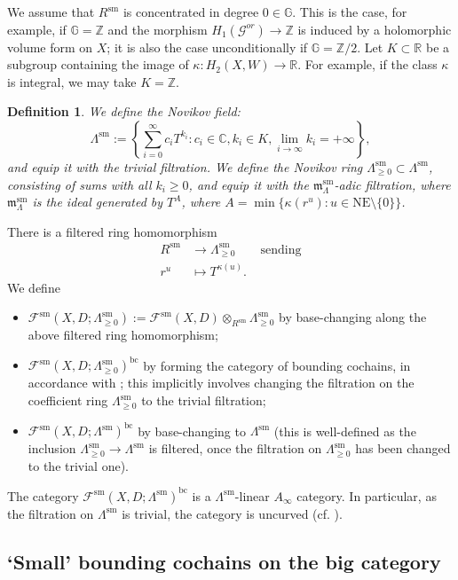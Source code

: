 \documentclass{article}
\newtheorem{defn}[lem]{Definition}
\def\G{\mathbb{G}}
\def\cG{\mathcal{G}}
\def\fuk{\EuF}
\def\bc{\mathsf{bc}}
\newcommand{\fm}{\mathfrak{m}}
\def\G{\mathbb{G}}
\def\nov{r}
\def\NE{\mathrm{NE}}
\def\NE{\mathrm{NE}}
\def\R{\mathbb{R}}
\def\Z{\mathbb{Z}}
\def\fuk{\mathcal{F}}
\def\bc{{\operatorname{bc}}}
\def\C{\mathbb{C}}
\def\sm{{\operatorname{sm}}}
\begin{document}
We assume that $R^\sm$ is concentrated in degree $0 \in \G$. 
This is the case, for example, if $\G = \Z$ and the morphism $H_1(\cG^{or}) \to \Z$ is induced by a holomorphic volume form on $X$; it is also the case unconditionally if $\G = \Z/2$. 
Let $K \subset \R$ be a subgroup containing the image of $\kappa:H_2(X,W) \to \R$. 
For example, if the class $\kappa$ is integral, we may take $K = \Z$.

\begin{defn}
We define the \emph{Novikov field}:
$$\Lambda^\sm := \left\{ \sum_{i=0}^\infty c_i T^{k_i}: c_i \in \C, k_i \in K, \lim_{i \to \infty} k_i = +\infty\right\},$$
and equip it with the trivial filtration. 
We define the \emph{Novikov ring} $\Lambda^\sm_{\ge 0} \subset \Lambda^\sm$, consisting of sums with all $k_i \ge 0$, and equip it with the $\fm^\sm_\Lambda$-adic filtration, where $\fm^\sm_\Lambda$ is the ideal generated by $T^A$, where $A = \min\{\kappa(\nov^u): u \in \NE \setminus \{0\}\}$.
\end{defn}

There is a filtered ring homomorphism
\begin{align*}
    R^\sm & \to \Lambda^\sm_{\ge 0} \qquad \text{sending}\\
    \nov^u & \mapsto T^{\kappa(u)}.
\end{align*}
We define
\begin{itemize}
    \item $\fuk^\sm(X,D;\Lambda^\sm_{\ge 0}):= \fuk^\sm(X,D) \otimes_{R^\sm} \Lambda^\sm_{\ge 0}$ by base-changing along the above filtered ring homomorphism;
    \item $\fuk^\sm(X,D;\Lambda^\sm_{\ge 0})^\bc$ by forming the category of bounding cochains, in accordance with \cite[Definition 2.15]{relfukii}; this implicitly involves changing the filtration on the coefficient ring $\Lambda^\sm_{\ge 0}$ to the trivial filtration;
    \item $\fuk^\sm(X,D;\Lambda^\sm)^\bc$ by base-changing to $\Lambda^\sm$ (this is well-defined as the inclusion $\Lambda^\sm_{\ge 0} \to \Lambda^\sm$ is filtered, once the filtration on $\Lambda^\sm_{\ge 0}$ has been changed to the trivial one). 
\end{itemize}
The category $\fuk^\sm(X,D;\Lambda^\sm)^\bc$ is a $\Lambda^\sm$-linear $A_\infty$ category. 
In particular, as the filtration on $\Lambda^\sm$ is trivial, the category is uncurved (cf. \cite[Section 2.4]{relfukii}). 

\subsection{`Small' bounding cochains on the big category}
\end{document}
